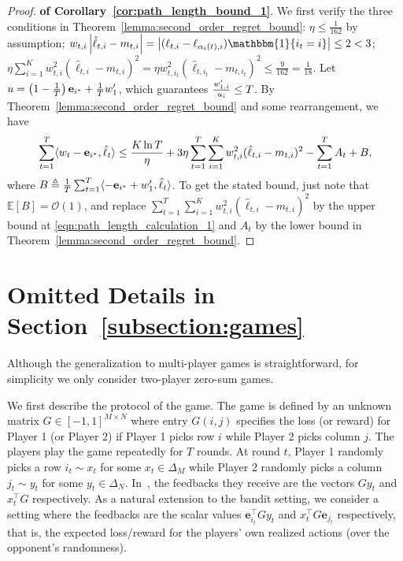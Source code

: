 \begin{proof}{\textbf{of Corollary~\ref{cor:path_length_bound_1}}.}
We first verify the three conditions in Theorem~\ref{lemma:second_order_regret_bound}: $\eta \leq \frac{1}{162}$ by assumption; $w_{t,i}\absolute{\hat{\ell}_{t,i}-m_{t,i}}=\absolute{(\ell_{t,i}-\ell_{\alpha_i(t),i})\mathbbm{1}\{i_t=i\}}\leq 2<3$; $\eta \sum_{i=1}^K w_{t,i}^2(\hat{\ell}_{t,i}-m_{t,i})^2=\eta w_{t,i_t}^2(\hat{\ell}_{t,i_t}-m_{t,i_t})^2\leq \frac{9}{162}=\frac{1}{18}$. Let $u=\left(1-\frac{1}{T}\right)\mathbf{e}_{i^*} + \frac{1}{T}w_1^\prime$, which guarantees $\frac{w_{1,i}^\prime}{u_i}\leq T$. By Theorem~\ref{lemma:second_order_regret_bound} and some rearrangement, we have
\begin{align*}
\sum_{t=1}^T \langle {w_t-\mathbf{e}_{i^*}, \hat{\ell}_t} \rangle\leq \frac{K\ln T}{\eta}  +3\eta\sum_{t=1}^T\sum_{i=1}^K  w_{t,i}^2(\hat{\ell}_{t,i}-m_{t,i})^2-\sum_{t=1}^T A_t+B, 
\end{align*}
where $B\triangleq \frac{1}{T}\sum_{t=1}^T \langle {-\mathbf{e}_{i^*}+w_1^\prime, \hat{\ell}_t} \rangle$. To get the stated bound, just note that $\mathbb{E}[B]=\mathcal{O}(1)$,  and replace $\sum_{t=1}^T\sum_{i=1}^K w_{t,i}^2(\hat{\ell}_{t,i}-m_{t,i})^2$ by the upper bound at \eqref{eqn:path_length_calculation_1} and $A_t$ by the lower bound in Theorem~\ref{lemma:second_order_regret_bound}.
\end{proof}

\section{Omitted Details in Section~\ref{subsection:games}}
\label{appendix:game}
Although the generalization to multi-player games is straightforward, for simplicity we only consider two-player zero-sum games.

We first describe the protocol of the game. The game is defined by an unknown matrix $G\in[-1,1]^{M\times N}$
where entry $G(i,j)$ specifies the loss (or reward) for Player 1 (or Player 2) if Player 1 picks row $i$ while Player 2 picks column $j$.
The players play the game repeatedly for $T$ rounds.
At round $t$, Player 1 randomly picks a row $i_t \sim x_t$ for some $x_t \in \Delta_M$
while Player 2 randomly picks a column $j_t \sim y_t$ for some $y_t \in \Delta_N$.
In~\citep{syrgkanis2015fast}, the feedbacks they receive are the vectors $Gy_t$ and $x_t^\top G$ respectively.
As a natural extension to the bandit setting, we consider a setting where the feedbacks are the scalar values $\mathbf{e}_{i_t}^\top Gy_t$
and $x_t^\top G\mathbf{e}_{j_t}$ respectively, that is, the expected loss/reward for the players' own realized actions (over the opponent's randomness). 

